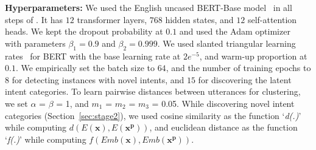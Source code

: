 \noindent \textbf{Hyperparameters:} %
We used the English uncased BERT-Base model~\cite{devlin2018bert} in all steps of \mname{}. It has $12$ transformer layers, $768$ hidden states, and $12$ self-attention heads. We kept the dropout probability at $0.1$ and used the Adam optimizer~\cite{kingma2014adam} with parameters $\beta_1= 0.9$ and $\beta_2= 0.999$. We used slanted triangular learning rates~\cite{howard2018universal} for BERT with the base learning rate at $2e^{-5}$, and warm-up proportion at $0.1$. We empirically set the batch size to $64$, and the number of training epochs to $8$ for detecting instances with novel intents, and $15$ for discovering the latent intent categories. %
To learn pairwise distances between utterances for clustering, we set $\alpha$ = $\beta$ = 1, and $m_1$ = $m_2$ = $m_3$ = 0.05. While discovering novel intent categories (Section~\ref{sec:stage2}), we used cosine similarity as the function `\textit{d(.)}' while computing $d(E(\bm{x}), E(\bm{x^p}))$, and euclidean distance as the function `\textit{f(.)}' while computing $f(Emb(\bm{x}), Emb(\bm{x^p}))$.

